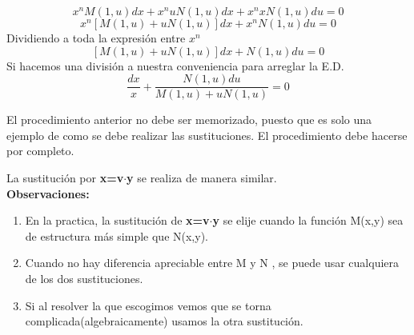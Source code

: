 \documentclass[11pt,fleqn]{book} %
\begin{document}
\begin{displaymath}
x^nM(1,u)dx+x^nuN(1,u)dx+x^nxN(1,u)du=0
\end{displaymath}
\begin{displaymath}
x^n\left[M(1,u)+uN(1,u)\right]dx+x^nN(1,u)du=0
\end{displaymath}
Dividiendo a toda la expresión entre $x^n$
\begin{displaymath}
\left[M(1,u)+uN(1,u)\right]dx+N(1,u)du=0
\end{displaymath}
Si hacemos una división a nuestra conveniencia para arreglar la E.D.
\begin{displaymath}
\frac{dx}{x}+\frac{N(1,u)du}{M(1,u)+uN(1,u)}=0
\end{displaymath}
\begin{remark}
El procedimiento anterior no debe ser memorizado, puesto que es solo una ejemplo de como se debe realizar las sustituciones. El procedimiento debe hacerse por completo.
\end{remark}
La sustitución por \textbf{x=v$\cdot$y} se realiza de manera similar.\\
\textbf{Observaciones:}
\begin{enumerate}
\item En la practica, la sustitución de \textbf{x=v$\cdot$y} se elije cuando la función M(x,y) sea de estructura más simple que N(x,y).
\item Cuando no hay diferencia apreciable entre M y N 
, se puede usar cualquiera de los dos sustituciones.
\item Si al resolver la que escogimos vemos que se torna complicada(algebraicamente) usamos la otra sustitución.
\end{enumerate}
\end{document}
